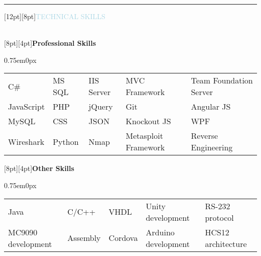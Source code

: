 \documentclass[12pt]{res}
\newenvironment{ResumeBlock}[1]
{
	\begin{large}
		\raisebox{0pt}[12pt][8pt]{\textcolor{lightblue}{#1}}
	\end{large}
	\\
}
{	
}
\newenvironment{DetailsBlockNoSubheader}[1]
{
	\raisebox{0pt}[8pt][4pt]{\textbf{\color{darkfont}#1}}
	\begin{adjustwidth}{0.75em}{0px}
	}
	{	
	\end{adjustwidth}
}
\begin{document}
	\hrule
	\begin{ResumeBlock}{TECHNICAL SKILLS}		
		\begin{DetailsBlockNoSubheader}{Professional Skills}
			\begin{tabular}{ l l l l l }
				C\# & MS SQL & IIS Server & MVC Framework & Team Foundation Server \\ 
				JavaScript & PHP & jQuery & Git & Angular JS \\
				MySQL & CSS & JSON & Knockout JS & WPF \\
				Wireshark & Python & Nmap & Metasploit Framework & Reverse Engineering \\
			\end{tabular}
		\end{DetailsBlockNoSubheader}
		\begin{DetailsBlockNoSubheader}{Other Skills}	
			\begin{tabular}{ l l l l l }
				Java & C/C++ & VHDL & Unity development & RS-232 protocol \\ 
				MC9090 development & Assembly & Cordova & Arduino development & HCS12 architecture \\ 
			\end{tabular}
		\end{DetailsBlockNoSubheader}
	\end{ResumeBlock}
\end{document}
